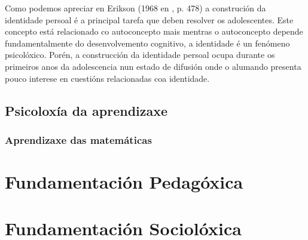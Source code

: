 Como podemos apreciar en Erikson (1968 en , p. 478) a construción da identidade persoal é a principal tarefa que deben resolver os adolescentes. Este concepto está relacionado co autoconcepto mais mentras o autoconcepto depende fundamentalmente do desenvolvemento cognitivo, a identidade é un fenómeno psicolóxico. Porén, a construcción da identidade persoal ocupa durante os primeiros anos da adolescencia nun estado de difusión onde o alumando presenta pouco interese en cuestións relacionadas coa identidade.

\subsection{Psicoloxía da aprendizaxe}


\subsubsection{Aprendizaxe das matemáticas}



\section{Fundamentación Pedagóxica}


\section{Fundamentación Sociolóxica}
